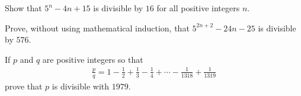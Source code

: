 %

\begin{problem}
	Show that $5^{n} -4n+15$ is divisible by $16$ for all positive integers $n$.
\end{problem}


\begin{problem}
	Prove, without using mathematical induction, that  $5^{2n+2} -24 n -25$ is divisible by $576$.
\end{problem}


\begin{problem}
	If $p$ and $q$ are positive integers so that
		\begin{align*}
			\frac{p}{q}=1-\frac{1}{2}+\frac{1}{3}-\frac{1}{4}+ \cdots -\frac{1}{1318}+\frac{1}{1319}
		\end{align*}
	prove that $p$ is divisible with $1979$. %
\end{problem}

